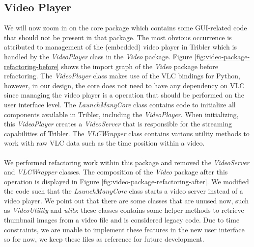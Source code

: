 \subsection{Video Player}
We will now zoom in on the core package which contains some GUI-related code that should not be present in that package. The most obvious occurrence is attributed to management of the (embedded) video player in Tribler which is handled by the \emph{VideoPlayer} class in the \emph{Video} package. Figure \ref{fig:video-package-refactoring-before} shows the import graph of the  \emph{Video} package before refactoring. The \emph{VideoPlayer} class makes use of the VLC bindings for Python, however, in our design, the core does not need to have any dependency on VLC since managing the video player is a operation that should be performed on the user interface level. The \emph{LaunchManyCore} class contains code to initialize all components available in Tribler, including the \emph{VideoPlayer}. When initializing, this \emph{VideoPlayer} creates a \emph{VideoServer} that is responsible for the streaming capabilities of Tribler. The \emph{VLCWrapper} class contains various utility methods to work with raw VLC data such as the time position within a video.\\\\
We performed refactoring work within this package and removed the \emph{VideoServer} and \emph{VLCWrapper} classes. The composition of the \emph{Video} package after this operation is displayed in Figure \ref{fig:video-package-refactoring-after}. We modified the code such that the  \emph{LaunchManyCore} class starts a video server instead of a video player. We point out that there are some classes that are unused now, such as \emph{VideoUtility} and \emph{utils}: these classes contains some helper methods to retrieve thumbnail images from a video file and is considered legacy code. Due to time constraints, we are unable to implement these features in the new user interface so for now, we keep these files as reference for future development.

